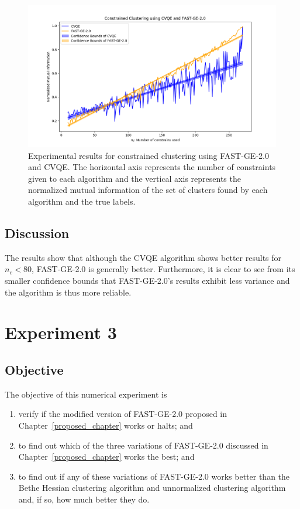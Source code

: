 \begin{figure}[h]
\begin{center}
\includegraphics[width=16cm]{figures/MR.png}
\end{center}
   \caption[Experimental results for constrained clustering using FAST-GE-2.0 and CVQE]{Experimental results for constrained clustering using FAST-GE-2.0 and CVQE. The horizontal axis represents the number of constraints given to each algorithm and the vertical axis represents the normalized mutual information of the set of clusters found by each algorithm and the true labels.}
\label{MR}
\end{figure}

\subsection*{Discussion}
The results show that although the CVQE algorithm shows better results for $n_c < 80$, FAST-GE-2.0 is generally better.
Furthermore, it is clear to see from its smaller confidence bounds that FAST-GE-2.0's results exhibit less variance and the algorithm is thus more reliable.



\section{Experiment 3}
\subsection*{Objective}
The objective of this numerical experiment is
\begin{enumerate}[(1)]
   \item verify if the modified version of FAST-GE-2.0 proposed in Chapter~\ref{proposed_chapter} works or halts; and
   \item to find out which of the three variations of FAST-GE-2.0 discussed in Chapter~\ref{proposed_chapter} works the best; and
   \item to find out if any of these variations of FAST-GE-2.0 works better than the Bethe Hessian clustering algorithm and unnormalized clustering algorithm and, if so, how much better they do.
\end{enumerate}
